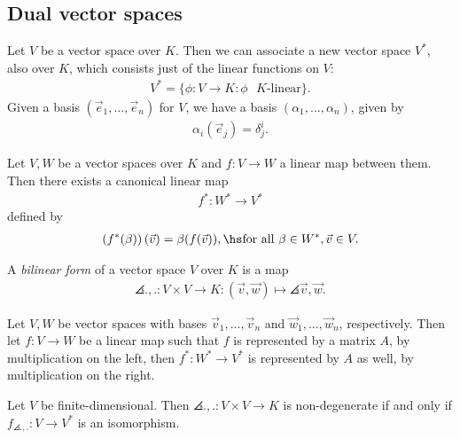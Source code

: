 \documentclass{article}
\begin{document}
\subsection{Dual vector spaces}

\begin{definition}
	Let $V$ be a vector space over $K$. Then we can associate a new vector space $V^*$,
	also over $K$, which consists just of the linear functions on $V$:
	\begin{align*}
		V^* = \{\phi : V\to K : \phi \text{ $K$-linear}\}.
	\end{align*}
	Given a basis $(\vec e_1,..., \vec e_n)$ for $V$, we have a basis $(\alpha_1, ..., \alpha_n)$,
	given by
	\begin{align*}
		\alpha_i(\vec e_j) = \delta_j^i.
	\end{align*}
\end{definition}

\begin{definition}
	Let $V,W$ be a vector spaces over $K$ and $f:V\to W$ a linear map between them.
	Then there exists a canonical linear map
	\begin{align*}
		f^*:W^*\to V^*
	\end{align*}
	defined by
	\begin{align*}
		\left(f^*(\beta)\right)(\vec v) = \beta(f(\vec v)), \hs\text{for all } \beta\in W^*,\vec v\in V.
	\end{align*}
\end{definition}

\begin{definition}
	A \emph{bilinear form} of a vector space $V$ over $K$ is a map
	\begin{align*}
		\angles{.,.} : V\times V \to K : (\vec v, \vec w) \mapsto \angles{\vec v, \vec w}.
	\end{align*}
\end{definition}

\begin{lemma}
	Let $V,W$ be vector spaces with bases $\vec v_1,...,\vec v_n$ and $\vec w_1,...,\vec w_n$,
	respectively. Then let $f:V\to W$ be a linear map such that $f$ is represented by a matrix
	$A$, by multiplication on the left, then $f^*:W^*\to V^*$ is represented by $A$ as well,
	by multiplication on the right.
\end{lemma}

\begin{lemma}
	Let $V$ be finite-dimensional. Then $\angles{.,.}:V\times V\to K$ is non-degenerate if and only if
	$f_{\angles{.,.}}:V\to V^*$ is an isomorphism.
\end{lemma}
\end{document}

